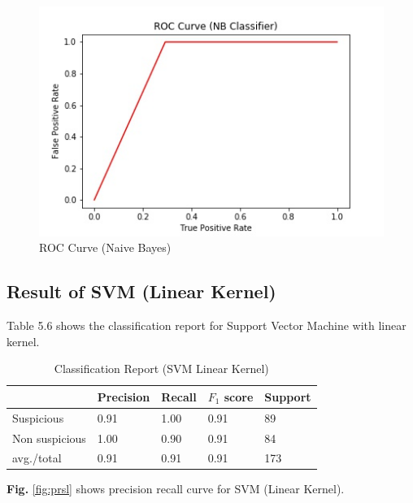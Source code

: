 \begin{figure}[h!]
    \centering
    \includegraphics[scale=0.58]{Figures/ROCN.jpg}
    \caption{ROC Curve (Naive Bayes)}
    \label{fig:rocn}
\end{figure}


\subsection{Result of SVM (Linear Kernel)}
Table 5.6 shows the classification report for Support Vector Machine with linear kernel.

\begin{table}[h!]
\begin{center}
\caption{Classification Report (SVM Linear Kernel)}
\begin{tabular}{|m{4.4cm} | m{2cm}| m{2cm}| m{2cm}| m{2cm}|}
\hline
     & Precision & Recall & $F_1$ score & Support \\
\hline
     Suspicious & 0.91 & 1.00 & 0.91 & 89\\
\hline 
     Non suspicious  & 1.00 & 0.90 & 0.91 & 84\\
\hline 
     avg./total & 0.91 & 0.91 & 0.91 & 173\\
\hline
\end{tabular}
\end{center}
\end{table}

\noindent
\textbf{Fig.} \ref{fig:prsl} shows precision recall curve for SVM (Linear Kernel).

